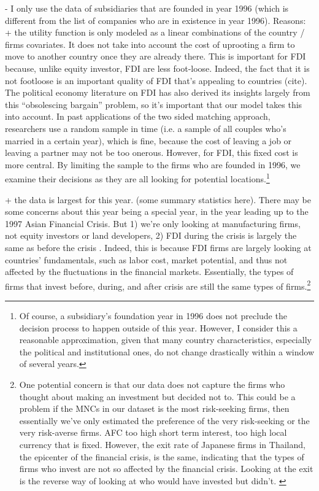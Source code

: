 - I only use the data of subsidiaries that are founded in year 1996 (which is
different from the list of companies who are in existence in year 1996). Reasons:
+ the utility function is only modeled as a linear combinations of the country /
firms covariates. It does not take into account the cost of uprooting a firm to
move to another country once they are already there. This is important for FDI
because, unlike equity investor, FDI are less foot-loose. Indeed, the fact that
it is not footloose is an important quality of FDI that's appealing to countries
(cite). The political economy literature on FDI has also derived its insights
largely from this ``obsolescing bargain'' problem, so it's important that our
model takes this into account. In past applications of the two sided matching
approach, researchers use a random sample in time (i.e. a sample of all couples
who's married in a certain year), which is fine, because the
cost of leaving a job or leaving a partner may not be too onerous. However, for
FDI, this fixed cost is more central. By limiting the sample to the firms who
are founded in 1996, we examine their decisions as they are all looking for
potential locations.\footnote{Of course, a subsidiary's foundation year in 1996
  does not preclude the decision process to happen outside of this year.
  However, I consider this a reasonable approximation, given that many country
  characteristics, especially the political and institutional ones, do not
  change drastically within a window of several years.}

+ the data is largest for this year. (some summary statistics here). There may
be some concerns about this year being a special year, in the year leading up to
the 1997 Asian Financial Crisis. But 1) we're only looking at manufacturing
firms, not equity investors or land developers, 2) FDI during the crisis is
largely the same as before the crisis \citep{UNCTAD1998}. Indeed, this is
because FDI firms are largely looking at countries' fundamentals, such as labor
cost, market potential, and thus not affected by the fluctuations in the
financial markets. Essentially, the types of firms that invest before, during,
and after crisis are still the same types of firms.\footnote{One potential
  concern is that our data does not capture the firms who thought about making
  an investment but decided not to. This could be a problem if the MNCs in our
  dataset is the most risk-seeking firms, then essentially we've only estimated
  the preference of the very risk-seeking or the very risk-averse firms. AFC too
high short term interest, too high local currency that is fixed. However, the
exit rate of Japanese firms in Thailand, the epicenter of the financial crisis,
is the same, indicating that the types of firms who invest are not so affected
by the financial crisis. Looking at the exit is the reverse way of looking at
who would have invested but didn't. \citep{Delios2001}}

